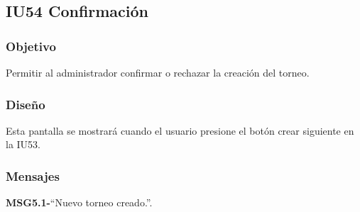 
\subsection{IU54 Confirmación}

\subsubsection{Objetivo}
	Permitir al administrador confirmar o rechazar la creación del torneo.

\subsubsection{Diseño}
	Esta pantalla se mostrará cuando el usuario presione el botón crear siguiente en la IU53.


\subsubsection{Mensajes}
	\begin{Citemize}
		\item {\bf MSG5.1-}``Nuevo torneo creado.''.
	\end{Citemize}
